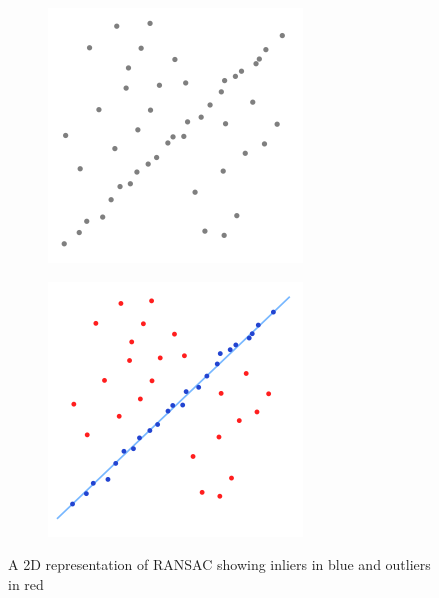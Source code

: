 				\begin{figure}[H]
					\centering
					\begin{subfigure}{.5\textwidth}
						\centering
						\includegraphics[width=1\linewidth]{Includes/images/random_sample_example1}
						\label{fig:RANSAC1}
					\end{subfigure}%
					\begin{subfigure}{.5\textwidth}
						\centering
						\includegraphics[width=1\linewidth]{Includes/images/random_sample_example2}
						\label{fig:RANSAC2}
					\end{subfigure}
					\caption{A 2D representation of RANSAC showing inliers in blue and outliers in red}
				\end{figure} 
			 
